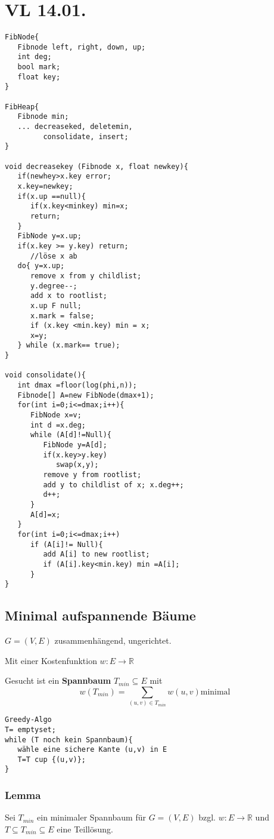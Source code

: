 \documentclass[a4paper,draft,twoside,10pt]{report}
\begin{document}
\chapter{VL 14.01.}
\begin{verbatim}
FibNode{
   Fibnode left, right, down, up;
   int deg;
   bool mark;
   float key;
}

FibHeap{
   Fibnode min;
   ... decreaseked, deletemin,
         consolidate, insert;
}

void decreasekey (Fibnode x, float newkey){
   if(newhey>x.key error;
   x.key=newkey;
   if(x.up ==null){
      if(x.key<minkey) min=x;
      return;
   }
   FibNode y=x.up;
   if(x.key >= y.key) return;
      //löse x ab
   do{ y=x.up;
      remove x from y childlist;
      y.degree--;
      add x to rootlist;
      x.up F null;
      x.mark = false;
      if (x.key <min.key) min = x;
      x=y;
   } while (x.mark== true);
}

void consolidate(){
   int dmax =floor(log(phi,n));
   Fibnode[] A=new FibNode(dmax+1);
   for(int i=0;i<=dmax;i++){
      FibNode x=v;
      int d =x.deg;
      while (A[d]!=Null){
         FibNode y=A[d];
         if(x.key>y.key)
            swap(x,y);
         remove y from rootlist;
         add y to childlist of x; x.deg++;
         d++;
      }
      A[d]=x;
   }
   for(int i=0;i<=dmax;i++)
      if (A[i]!= Null){
         add A[i] to new rootlist;
         if (A[i].key<min.key) min =A[i];
      }
}
\end{verbatim}

\section{Minimal aufspannende Bäume}
$G=(V,E)$ zusammenhängend, ungerichtet. 

Mit einer Kostenfunktion $ w: E\rightarrow \mathbb R$

Gesucht ist ein \textbf{Spannbaum} $T_{min} \subseteq E$ mit
\[w(T_{min})=\sum _{(u,v)\in T_{min}} w(u,v) \mbox{minimal}\]
\begin{verbatim}
Greedy-Algo
T= emptyset;
while (T noch kein Spannbaum){
   wähle eine sichere Kante (u,v) in E
   T=T cup {(u,v)};
}
\end{verbatim}
\subsection{Lemma}
Sei $T_{min}$ ein minimaler Spannbaum für $G=(V,E)$
bzgl. $w: E\rightarrow \mathbb R $ und $ T\subseteq T_{min} \subseteq E$ eine Teillösung.
\end{document}
